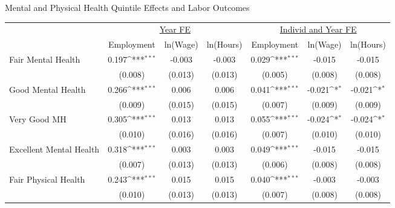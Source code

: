 \def\sym#1{\ifmmode^{#1}\else\(^{#1}\)\fi}
\caption{Mental and Physical Health Quintile Effects and Labor Outcomes}
\footnotesize\begin{tabular}{l*{6}{c}}
                    &\multicolumn{3}{c}{\underline{Year FE}}                          &\multicolumn{3}{c}{\underline{Individ and Year FE}}              \\\cmidrule(lr){2-4}\cmidrule(lr){5-7}
                    &\multicolumn{1}{c}{Employment}&\multicolumn{1}{c}{ln(Wage)}&\multicolumn{1}{c}{ln(Hours)}&\multicolumn{1}{c}{Employment}&\multicolumn{1}{c}{ln(Wage)}&\multicolumn{1}{c}{ln(Hours)}\\
\hline
Fair Mental Health  &       0.197\sym{***}&      -0.003         &      -0.003         &       0.029\sym{***}&      -0.015         &      -0.015         \\
                    &     (0.008)         &     (0.013)         &     (0.013)         &     (0.005)         &     (0.008)         &     (0.008)         \\
Good Mental Health  &       0.266\sym{***}&       0.006         &       0.006         &       0.041\sym{***}&      -0.021\sym{*}  &      -0.021\sym{*}  \\
                    &     (0.009)         &     (0.015)         &     (0.015)         &     (0.007)         &     (0.009)         &     (0.009)         \\
Very Good MH        &       0.305\sym{***}&       0.013         &       0.013         &       0.055\sym{***}&      -0.024\sym{*}  &      -0.024\sym{*}  \\
                    &     (0.010)         &     (0.016)         &     (0.016)         &     (0.007)         &     (0.010)         &     (0.010)         \\
Excellent Mental Health&       0.318\sym{***}&       0.003         &       0.003         &       0.049\sym{***}&      -0.015         &      -0.015         \\
                    &     (0.007)         &     (0.013)         &     (0.013)         &     (0.006)         &     (0.008)         &     (0.008)         \\
Fair Physical Health&       0.243\sym{***}&       0.015         &       0.015         &       0.040\sym{***}&      -0.003         &      -0.003         \\
                    &     (0.010)         &     (0.013)         &     (0.013)         &     (0.007)         &     (0.008)         &     (0.008)         \\

\end{tabular}

